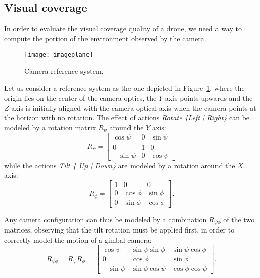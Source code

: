 \documentclass{article}
\begin{document}
\subsection{Visual coverage}
\label{subsec:coverage}
In order to evaluate the visual coverage quality of a drone, we need a way to compute the portion of the environment observed by the camera.
\begin{figure}
	\centering
	\texttt{[image: imageplane]}
	\caption{Camera reference system.}
	\label{fig:imageplane}
\end{figure}
Let us consider a reference system as the one depicted in Figure~\ref{fig:imageplane}, where the origin lies on the center of the camera optics, the $Y$ axis points upwards and the $Z$ axis is initially aligned with the camera optical axis when the camera points at the horizon with no rotation. The effect of actions \emph{Rotate \{Left | Right\}} can be modeled by a rotation matrix $R_\psi$ around the $Y$ axis: 
\begin{equation}
	R_\psi = \begin{bmatrix}
	\cos \psi & 0 & \sin \psi \\
	0 & 1 & 0 \\
	-\sin \psi & 0 & \cos\psi
	\end{bmatrix}
\end{equation}
while the actions \emph{Tilt \{ Up | Down\}} are modeled by a rotation around the $X$ axis:
\begin{equation}
	R_\phi = \begin{bmatrix}
	1 & 0 & 0 \\
	0 & \cos \phi & \sin \phi \\
	0 & \sin \phi & \cos \phi
	\end{bmatrix}.
\end{equation}

Any camera configuration can thus be modeled by a combination $R_{\psi\phi}$ of the two matrices, observing that the tilt rotation must be applied first, in order to correctly model the motion of a gimbal camera: 
\begin{equation}
	R_{\psi\phi} = R_\psi R_\phi = \begin{bmatrix}
	\cos\psi & \sin\psi \sin\phi & \sin\psi \cos\phi \\
	0 & \cos\phi & \sin\phi \\
	-\sin\psi & \sin\phi\cos\psi & \cos\phi \cos\psi
	\end{bmatrix}
	\label{eq:rotpsiphi}.
\end{equation}
\end{document}
